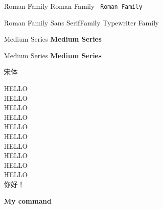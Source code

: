 \documentclass{article}
\newcommand{\myfont}{\textrm{\textsf{\textbf{My command}}}}
\begin{document}
    \textrm{
        Roman Family
    }
    \textsf{
        Roman Family
    }
    \texttt{
        Roman Family
    }

    {\rmfamily Roman Family} {\sffamily Sans SerifFamily} {\ttfamily Typewriter Family}


    \textmd{
        Medium Series
    }
    \textbf{
        Medium Series
    }

    {\mdseries Medium Series} {\bfseries Medium Series}

    {\songti 宋体}   

    {\tiny HELLO}\\
    {\scriptsize HELLO}\\
    {\footnotesize HELLO}\\
    {\small HELLO}\\
    {\normalsize HELLO}\\
    {\large HELLO}\\
    {\Large HELLO}\\
    {\LARGE HELLO}\\
    {\huge HELLO}\\
    {\Huge HELLO}\\

     你好！
    
    \myfont
\end{document}

